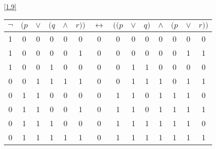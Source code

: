 \documentclass[boxes]{homework}
\begin{document}
\begin{solution}
    \ref{1.9}
    \begin{center}
        \begin{tabular}{cccccc|c|ccccccc}
            $\lnot$ & $(p$ & $\lor$ & $(q$ & $\land$ & $r))$ & $\leftrightarrow$ & $((p$ & $\lor$ & $q)$ & $\land$ & $(p$ & $\lor$ & $r))$ \\
            \hline
            1       & 0    & 0      & 0    & 0       & 0     & 0                 & 0     & 0      & 0    & 0       & 0    & 0      & 0     \\
            1       & 0    & 0      & 0    & 0       & 1     & 0                 & 0     & 0      & 0    & 0       & 0    & 1      & 1     \\
            1       & 0    & 0      & 1    & 0       & 0     & 0                 & 0     & 1      & 1    & 0       & 0    & 0      & 0     \\
            0       & 0    & 1      & 1    & 1       & 1     & 0                 & 0     & 1      & 1    & 1       & 0    & 1      & 1     \\
            0       & 1    & 1      & 0    & 0       & 0     & 0                 & 1     & 1      & 0    & 1       & 1    & 1      & 0     \\
            0       & 1    & 1      & 0    & 0       & 1     & 0                 & 1     & 1      & 0    & 1       & 1    & 1      & 1     \\
            0       & 1    & 1      & 1    & 0       & 0     & 0                 & 1     & 1      & 1    & 1       & 1    & 1      & 0     \\
            0       & 1    & 1      & 1    & 1       & 1     & 0                 & 1     & 1      & 1    & 1       & 1    & 1      & 1     \\
        \end{tabular}
    \end{center}
\end{solution}
\end{document}
